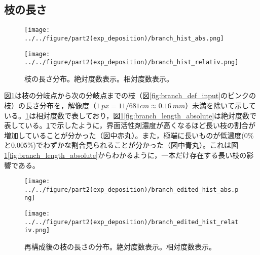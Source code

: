 \documentclass[autodetect-engine,dvi=dvipdfmx,a4paper,ja=standard,oneside,openany,11pt,draft]{bxjsbook}
\begin{document}
\subsection{枝の長さ}
\begin{figure}[htbp]
  \begin{minipage}
    {0.45\textwidth}
    \subcaption{}
    \centering
    \texttt{[image: ../../figure/part2(exp\_deposition)/branch\_hist\_abs.png]}
    \label{fig:branch_length_absolute}
  \end{minipage}
  \begin{minipage}
    {0.45\textwidth}
    \subcaption{}
    \centering
    \texttt{[image: ../../figure/part2(exp\_deposition)/branch\_hist\_relativ.png]}
    \label{fig:branch_length_relativ}
  \end{minipage}
  \caption{枝の長さ分布。絶対度数表示。相対度数表示。}
  \label{fig:branch_length}
\end{figure}
図\ref{fig:branch_length}は枝の分岐点から次の分岐点までの枝（図\ref{fig:branch_def_input}のピンクの枝）の長さ分布を，解像度（$\SI{1}{px}=11/681 \si{cm}\approx \SI{0.16}{mm}$）未満を除いて示している。\ref{fig:branch_length}は相対度数で表しており，図\ref{fig:branch_length}\ref{fig:branch_length_absolute}は絶対度数で表している。\ref{fig:branch_length}で示したように，界面活性剤濃度が高くなるほど長い枝の割合が増加していることが分かった（図中赤丸）。また，極端に長いものが低濃度(0\%と0.005\%)でわずかな割合見られることが分かった（図中青丸）。これは図\ref{fig:branch_length}\ref{fig:branch_length_absolute}からわかるように，一本だけ存在する長い枝の影響である。
\begin{figure}[htbp]
  \begin{minipage}
    {0.45\textwidth}
    \subcaption{}
    \centering
    \texttt{[image: ../../figure/part2(exp\_deposition)/branch\_edited\_hist\_abs.png]}
    \label{fig:branch_length_absolute_edited}
  \end{minipage}
  \begin{minipage}
    {0.45\textwidth}
    \subcaption{}
    \centering
    \texttt{[image: ../../figure/part2(exp\_deposition)/branch\_edited\_hist\_relativ.png]}
    \label{fig:branch_length_relativ_edited}
  \end{minipage}
  \caption{再構成後の枝の長さの分布。絶対度数表示。相対度数表示。}
  \label{fig:branch_length_edited}
\end{figure}
\end{document}
